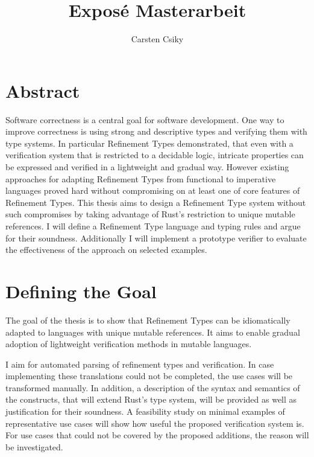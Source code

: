 \documentclass[11pt]{article}
\title{\textbf{Exposé Masterarbeit}}
\author{Carsten Csiky}
\date{}
\begin{document}
\maketitle

\section{Abstract}


Software correctness is a central goal for software development.
One way to improve correctness is using strong and descriptive types and verifying them with type systems.
In particular Refinement Types demonstrated, that even with a verification system that is restricted to a decidable logic, intricate properties can be expressed and verified in a lightweight and gradual way.
However existing approaches for adapting Refinement Types from functional to imperative languages proved hard without compromising on at least one of core features of Refinement Types.
This thesis aims to design a Refinement Type system without such compromises by taking advantage of Rust's restriction to unique mutable references. 
I will define a Refinement Type language and typing rules and argue for their soundness. Additionally I will implement a prototype verifier to evaluate the effectiveness of the approach on selected examples.



\section{Defining the Goal}

The goal of the thesis is to show that Refinement Types can be idiomatically adapted to languages with unique mutable references. It aims to enable gradual adoption of lightweight verification methods in mutable languages.

I aim for automated parsing of refinement types and verification.
In case implementing these translations could not be completed, the use cases will be transformed manually.
In addition, a description of the syntax and semantics of the constructs, that will extend Rust's type system, will be provided as well as justification for their soundness. A feasibility study on minimal examples of representative use cases will show how useful the proposed verification system is. For use cases that could not be covered by the proposed additions, the reason will be investigated.
\end{document}
